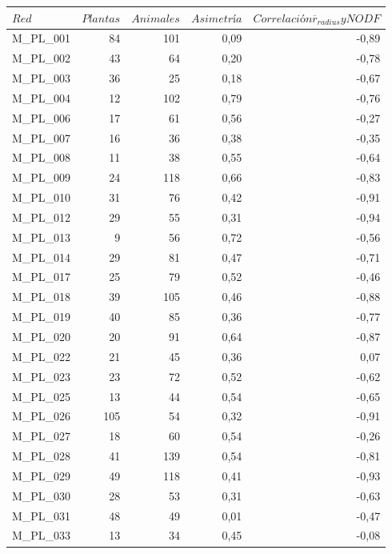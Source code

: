 \begin{table}[ht!]
  \centering
  \tiny
    \begin{tabular}{lrrrr}
    \toprule
    $Red$ & $Plantas$ & $Animales$ & $Asimetría$ & $Correlación \overline r_{radius} y NODF$ \\
    \midrule
    M\_PL\_001 & 84   & 101  & 0,09 & -0,89 \\
    M\_PL\_002 & 43   & 64   & 0,20 & -0,78 \\
    M\_PL\_003 & 36   & 25   & 0,18 & -0,67 \\
    M\_PL\_004 & 12   & 102  & 0,79 & -0,76 \\
    M\_PL\_006 & 17   & 61   & 0,56 & -0,27 \\
    M\_PL\_007 & 16   & 36   & 0,38 & -0,35 \\
    M\_PL\_008 & 11   & 38   & 0,55 & -0,64 \\
    M\_PL\_009 & 24   & 118  & 0,66 & -0,83 \\
    M\_PL\_010 & 31   & 76   & 0,42 & -0,91 \\
    M\_PL\_012 & 29   & 55   & 0,31 & -0,94 \\
    M\_PL\_013 & 9    & 56   & 0,72 & -0,56 \\
    M\_PL\_014 & 29   & 81   & 0,47 & -0,71 \\
    M\_PL\_017 & 25   & 79   & 0,52 & -0,46 \\
    M\_PL\_018 & 39   & 105  & 0,46 & -0,88 \\
    M\_PL\_019 & 40   & 85   & 0,36 & -0,77 \\
    M\_PL\_020 & 20   & 91   & 0,64 & -0,87 \\
    M\_PL\_022 & 21   & 45   & 0,36 & 0,07 \\
    M\_PL\_023 & 23   & 72   & 0,52 & -0,62 \\
    M\_PL\_025 & 13   & 44   & 0,54 & -0,65 \\
    M\_PL\_026 & 105  & 54   & 0,32 & -0,91 \\
    M\_PL\_027 & 18   & 60   & 0,54 & -0,26 \\
    M\_PL\_028 & 41   & 139  & 0,54 & -0,81 \\
    M\_PL\_029 & 49   & 118  & 0,41 & -0,93 \\
    M\_PL\_030 & 28   & 53   & 0,31 & -0,63 \\
    M\_PL\_031 & 48   & 49   & 0,01 & -0,47 \\
    M\_PL\_033 & 13   & 34   & 0,45 & -0,08 \\

\end{tabular}
\end{table}
